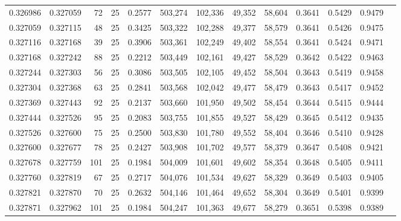 \begin{tabular}{rrrrrrrrrrrrr}
0.326986 & 0.327059 &    72 &  25 &                                     0.2577 & 503,274 & 102,336 &  49,352 &  58,604 & 0.3641 & 0.5429 & 0.9479 \\
0.327059 & 0.327115 &    48 &  25 &                                     0.3425 & 503,322 & 102,288 &  49,377 &  58,579 & 0.3641 & 0.5426 & 0.9475 \\
0.327116 & 0.327168 &    39 &  25 &                                     0.3906 & 503,361 & 102,249 &  49,402 &  58,554 & 0.3641 & 0.5424 & 0.9471 \\
0.327168 & 0.327242 &    88 &  25 &                                     0.2212 & 503,449 & 102,161 &  49,427 &  58,529 & 0.3642 & 0.5422 & 0.9463 \\
0.327244 & 0.327303 &    56 &  25 &                                     0.3086 & 503,505 & 102,105 &  49,452 &  58,504 & 0.3643 & 0.5419 & 0.9458 \\
0.327304 & 0.327368 &    63 &  25 &                                     0.2841 & 503,568 & 102,042 &  49,477 &  58,479 & 0.3643 & 0.5417 & 0.9452 \\
0.327369 & 0.327443 &    92 &  25 &                                     0.2137 & 503,660 & 101,950 &  49,502 &  58,454 & 0.3644 & 0.5415 & 0.9444 \\
0.327444 & 0.327526 &    95 &  25 &                                     0.2083 & 503,755 & 101,855 &  49,527 &  58,429 & 0.3645 & 0.5412 & 0.9435 \\
0.327526 & 0.327600 &    75 &  25 &                                     0.2500 & 503,830 & 101,780 &  49,552 &  58,404 & 0.3646 & 0.5410 & 0.9428 \\
0.327600 & 0.327677 &    78 &  25 &                                     0.2427 & 503,908 & 101,702 &  49,577 &  58,379 & 0.3647 & 0.5408 & 0.9421 \\
0.327678 & 0.327759 &   101 &  25 &                                     0.1984 & 504,009 & 101,601 &  49,602 &  58,354 & 0.3648 & 0.5405 & 0.9411 \\
0.327760 & 0.327819 &    67 &  25 &                                     0.2717 & 504,076 & 101,534 &  49,627 &  58,329 & 0.3649 & 0.5403 & 0.9405 \\
0.327821 & 0.327870 &    70 &  25 &                                     0.2632 & 504,146 & 101,464 &  49,652 &  58,304 & 0.3649 & 0.5401 & 0.9399 \\
0.327871 & 0.327962 &   101 &  25 &                                     0.1984 & 504,247 & 101,363 &  49,677 &  58,279 & 0.3651 & 0.5398 & 0.9389 \\

\end{tabular}
